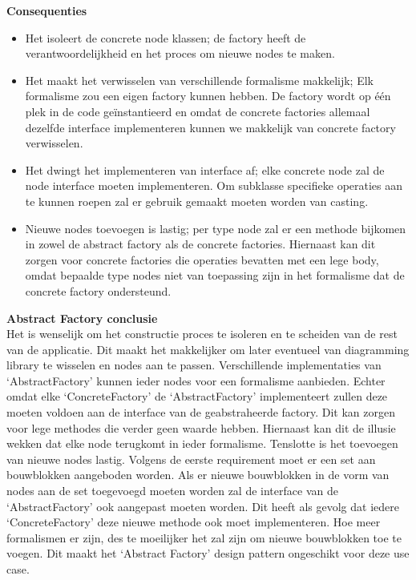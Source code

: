 \noindent\textbf{Consequenties}
\begin{itemize}
    \item Het isoleert de concrete node klassen; de factory heeft de verantwoordelijkheid en het proces om nieuwe nodes te maken.
    \item Het maakt het verwisselen van verschillende formalisme makkelijk; Elk formalisme zou een eigen factory kunnen hebben. De factory wordt op één plek in de code geïnstantieerd en omdat de concrete factories allemaal dezelfde interface implementeren kunnen we makkelijk van concrete factory verwisselen.
    \item Het dwingt het implementeren van interface af; elke concrete node zal de node interface moeten implementeren. Om subklasse specifieke operaties aan te kunnen roepen zal er gebruik gemaakt moeten worden van casting.
    \item Nieuwe nodes toevoegen is lastig; per type node zal er een methode bijkomen in zowel de abstract factory als de concrete factories. Hiernaast kan dit zorgen voor concrete factories die operaties bevatten met een lege body, omdat bepaalde type nodes niet van toepassing zijn in het formalisme dat de concrete factory ondersteund.
\end{itemize}

\noindent\textbf{Abstract Factory conclusie}\\
Het is wenselijk om het constructie proces te isoleren en te scheiden van de rest van de applicatie. Dit maakt het makkelijker om later eventueel van diagramming library te wisselen en nodes aan te passen. Verschillende implementaties van ‘AbstractFactory’ kunnen ieder nodes voor een formalisme aanbieden. Echter omdat elke ‘ConcreteFactory’ de ‘AbstractFactory’ implementeert zullen deze moeten voldoen aan de interface van de geabstraheerde factory. Dit kan zorgen voor lege methodes die verder geen waarde hebben. Hiernaast kan dit de illusie wekken dat elke node terugkomt in ieder formalisme. Tenslotte is het toevoegen van nieuwe nodes lastig. Volgens de eerste requirement moet er een set aan bouwblokken aangeboden worden. Als er nieuwe bouwblokken in de vorm van nodes aan de set toegevoegd moeten worden zal de interface van de ‘AbstractFactory’ ook aangepast moeten worden. Dit heeft als gevolg dat iedere ‘ConcreteFactory’ deze nieuwe methode ook moet implementeren. Hoe meer formalismen er zijn, des te moeilijker het zal zijn om nieuwe bouwblokken toe te voegen. Dit maakt het ‘Abstract Factory’ design pattern ongeschikt voor deze use case.

